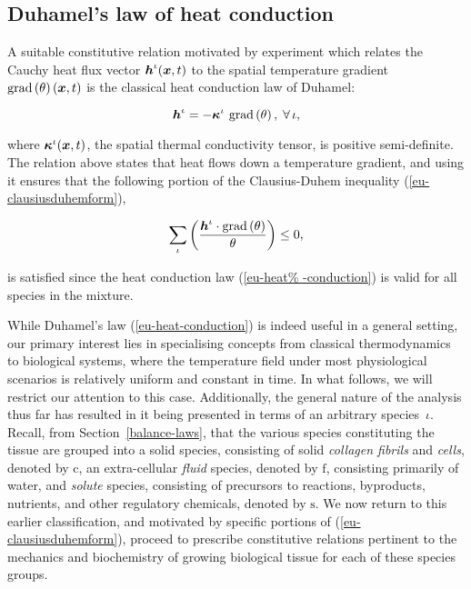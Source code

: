 \subsection{Duhamel's law of heat conduction}
\label{eu-duhamel-law}

A suitable constitutive relation motivated by experiment which relates
the Cauchy heat flux vector $\mbox{\boldmath$ h$}^{\iota}(\mbox{\boldmath$ x$},t)$ to the spatial
temperature gradient $\mathrm{grad}\left(\theta\right)(\mbox{\boldmath$ x$},t)$ is the
classical heat conduction law of Duhamel:

\begin{equation}
\mbox{\boldmath$ h$}^{\iota} =  -
\mbox{\boldmath$\kappa$}^{\iota}\ \mathrm{grad}\left(\theta\right),\;\forall\,\iota,
\label{eu-heat-conduction}
\end{equation}

\noindent where $\mbox{\boldmath$\kappa$}^{\iota}(\mbox{\boldmath$ x$},t)$, the spatial thermal
conductivity tensor, is positive semi-definite. The relation above
states that heat flows down a temperature gradient, and using it
ensures that the following portion of the Clausius-Duhem inequality
(\ref{eu-clausiusduhemform}),

\begin{equation*}
\sum\limits_{\iota}
\left(\frac{\mbox{\boldmath$ h$}^{\iota} \cdot 
  \mathrm{grad}\left(\theta\right)}{\theta} \right) \leq 0,
\end{equation*}

\noindent is satisfied since the heat conduction law (\ref{eu-heat%
  -conduction}) is valid for all species in the mixture.

While Duhamel's law (\ref{eu-heat-conduction}) is indeed useful in a
general setting, our primary interest lies in specialising concepts
from classical thermodynamics to biological systems, where the
temperature field under most physiological scenarios is relatively
uniform and constant in time. In what follows, we will restrict our
attention to this case. Additionally, the general nature of the
analysis thus far has resulted in it being presented in terms of an
arbitrary species~$\iota$. Recall, from Section~\ref{balance-laws},
that the various species constituting the tissue are grouped into a
solid species, consisting of solid \emph{collagen fibrils} and
\emph{cells}, denoted by $\mathrm{c}$, an extra-cellular \emph{fluid}
species, denoted by $\mathrm{f}$, consisting primarily of water, and
\emph{solute} species, consisting of precursors to reactions,
byproducts, nutrients, and other regulatory chemicals, denoted by
$\mathrm{s}$. We now return to this earlier classification, and
motivated by specific portions of (\ref{eu-clausiusduhemform}),
proceed to prescribe constitutive relations pertinent to the mechanics
and biochemistry of growing biological tissue for each of these
species groups.

